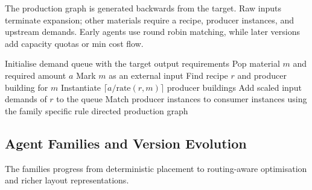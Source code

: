 \documentclass[11pt,a4paper]{article}
\begin{document}
The production graph is generated backwards from the target. Raw inputs terminate expansion; other materials require a recipe, producer instances, and upstream demands. Early agents use round robin matching, while later versions add capacity quotas or min cost flow.

\begin{algorithm}[H]
    \caption{Backward production graph construction}
    \label{alg:production-graph}
    \begin{algorithmic}[1]
        \State Initialise demand queue with the target output requirements
            \State Pop material $m$ and required amount $a$
                \State Mark $m$ as an external input
            \Else
                \State Find recipe $r$ and producer building for $m$
                \State Instantiate $\lceil a / \mathrm{rate}(r,m)\rceil$ producer buildings
                \State Add scaled input demands of $r$ to the queue
            \EndIf
        \EndWhile
        \State Match producer instances to consumer instances using the family specific rule
        \State \Return directed production graph
    \end{algorithmic}
\end{algorithm}

\subsection{Agent Families and Version Evolution}

The families progress from deterministic placement to routing-aware optimisation and richer layout representations.
\end{document}
